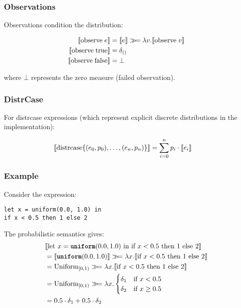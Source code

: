 \subsubsection{Observations}

Observations condition the distribution:

\begin{align*}
\llbracket  \text{observe}\; e  \rrbracket &= \llbracket  e  \rrbracket \gg\!= \lambda v. \llbracket  \text{observe}\; v  \rrbracket \\
\llbracket  \text{observe}\; \text{true}  \rrbracket &= \delta_{()} \\
\llbracket  \text{observe}\; \text{false}  \rrbracket &= \bot
\end{align*}

where $\bot$ represents the zero measure (failed observation).

\subsubsection{DistrCase}

For distrcase expressions (which represent explicit discrete distributions in the implementation):

\begin{align*}
\llbracket  \text{distrcase}\{(e_0, p_0), \ldots, (e_n, p_n)\}  \rrbracket &= \sum_{i=0}^n p_i \cdot \llbracket  e_i  \rrbracket
\end{align*}

\subsubsection{Example}

Consider the expression:
\begin{lstlisting}
let x = uniform(0.0, 1.0) in
if x < 0.5 then 1 else 2
\end{lstlisting}

The probabilistic semantics gives:
\begin{align*}
&\llbracket  \text{let } x = \text{\ttfamily\bfseries uniform}(0.0, 1.0) \text{ in if } x < 0.5 \text{ then } 1 \text{ else } 2  \rrbracket \\
&= \llbracket  \text{\ttfamily\bfseries uniform}(0.0, 1.0)  \rrbracket \gg\!= \lambda x. \llbracket  \text{if } x < 0.5 \text{ then } 1 \text{ else } 2  \rrbracket \\
&= \text{Uniform}_{[0,1)} \gg\!= \lambda x. \llbracket  \text{if } x < 0.5 \text{ then } 1 \text{ else } 2  \rrbracket \\
&= \text{Uniform}_{[0,1)} \gg\!= \lambda x. \begin{cases}
    \delta_1 & \text{if } x < 0.5 \\
    \delta_2 & \text{if } x \geq 0.5
\end{cases} \\
&= 0.5 \cdot \delta_1 + 0.5 \cdot \delta_2
\end{align*}

